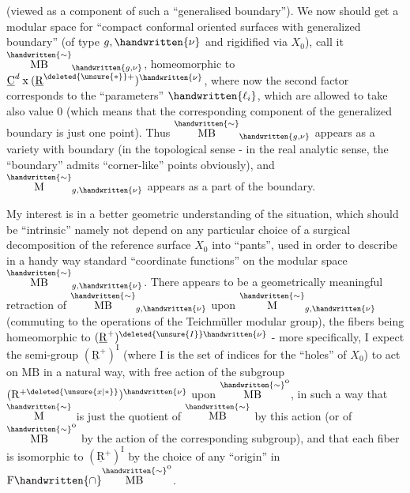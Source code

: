 

(viewed as a component of such a ``generalised boundary''). We now should  get a modular space for ``compact conformal oriented surfaces with generalized boundary'' (of type $g,\handwritten{\nu}$ and rigidified via $X_0$), call it $\overset{\handwritten{\sim}}{\mathrm{MB}}_{\handwritten{g,\nu}}$, homeomorphic to $\underline{\mathrm C}^d\mathbin{\mathrm x}(\underline{\mathrm R}^{\deleted{\unsure{*}}+})^{\handwritten{\nu}}$, where now the second factor corresponds to  the ``parameters'' $\handwritten{\ell_i}$, which are allowed to take also value 0 (which means that the corresponding component of the generalized boundary is just one point). Thus $\overset{\handwritten{\sim}}{\mathrm{MB}}_{\handwritten{g,\nu}}$ appears as a variety with boundary (in the topological sense - in the real analytic sense, the ``boundary'' admits ``corner-like'' points obviously), and $\overset{\handwritten{\sim}}{\mathrm M}_{g,\handwritten{\nu}}$ appears as a part of the boundary.

My interest is in a better geometric understanding of the situation, which should be ``intrinsic'' namely not depend on any particular choice of a surgical decomposition of the reference surface $X_0$ into ``pants'', used in order to describe in a handy way  standard ``coordinate functions'' on the modular space $\overset{\handwritten{\sim}}{\mathrm{MB}}_{g,\handwritten{\nu}}$. There appears to be a geometrically meaningful retraction of $\overset{\handwritten{\sim}}{\mathrm{MB}}_{g,\handwritten{\nu}}$  upon $\overset{\handwritten{\sim}}{\mathrm M}_{g,\handwritten{\nu}}$ (commuting to the operations of the Teichmüller modular group), the fibers being homeomorphic to $(\underline{\mathrm R}^{+})^{\deleted{\unsure{I}}\handwritten{\nu}}$ - more specifically, I expect the semi-group $(\underline{\mathrm R}^+)^{\mathrm I}$ (where I is the set of indices for the ``holes'' of $X_0$) to act on $\mathrm{MB}$ in a natural way, with free action of the subgroup $(\mathrm R^{+\deleted{\unsure{x|*}}})^{\handwritten{\nu}}$ upon $\overset{\handwritten{\sim}}{\mathrm{MB}}^{\mathrm o}$, in such a way that $\overset{\handwritten{\sim}}{\mathrm M}$ is just the quotient of $\overset{\handwritten{\sim}}{\mathrm{MB}}$ by this action (or of $\overset{\handwritten{\sim}}{\mathrm{MB}}^{\mathrm o}$ by the action of the  corresponding subgroup), and that each fiber  is isomorphic to $(\underline{\mathrm R}^+)^{\mathrm I}$ by the choice of any ``origin'' in $\mathrm F\handwritten{\cap}\overset{\handwritten{\sim}}{\mathrm{MB}}^{\mathrm o}$.

